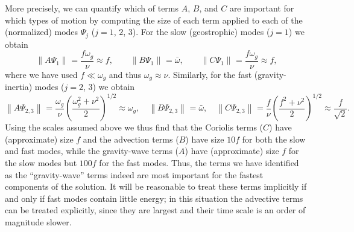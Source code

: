 \documentclass[12pt]{article}
\newcommand{\omegabar}{\bar{\omega}}
\newcommand{\norm}[2][{}]{\ensuremath{\left\|{#2}\right\|_{#1}}}
\begin{document}
More precisely, we can quantify which of terms $A$, $B$, and $C$ are important
for which types of motion by computing the size of each term applied to each
of the (normalized) modes $\Psi_j$ ($j=1$, $2$, $3$).  For the slow
(geostrophic) modes ($j=1$) we obtain
\begin{equation}
  \norm{A\Psi_1} = \frac{f\omega_g}{\nu}\approx f,
\qquad
  \norm{B\Psi_1} = \omegabar,
\qquad
  \norm{C\Psi_1} = \frac{f\omega_g}{\nu}\approx f,
\label{SW:sizes:slowmodes}
\end{equation}
where we have used $f\ll\omega_g$ and thus $\omega_g\approx\nu$.
Similarly, for the fast (gravity-inertia) modes ($j=2$, $3$) we obtain
\begin{equation}
  \norm{A\Psi_{2,3}} = \frac{\omega_g}{\nu}
                       \left(\frac{\omega_g^2 + \nu^2}{2}\right)^{1/2}
                     \approx \omega_g,
\quad
  \norm{B\Psi_{2,3}} = \omegabar,
\quad
  \norm{C\Psi_{2,3}} = \frac{f}{\nu}
                       \left(\frac{f^2 + \nu^2}{2}\right)^{1/2}
                     \approx \frac{f}{\sqrt{2}} .
\label{SW:sizes:fastmodes}
\end{equation}
Using the scales assumed above we thus find that the Coriolis terms ($C$) have
(approximate) size $f$ and the advection terms ($B$) have size $10f$ for both
the slow and fast modes, while the gravity-wave terms ($A$) have (approximate) 
size $f$ for the slow modes but $100f$ for the fast modes.  Thus, the terms we
have identified as the ``gravity-wave'' terms indeed are most important for
the fastest components of the solution.  It will be reasonable to treat these
terms implicitly if and only if fast modes contain little energy; in this
situation the advective terms can be treated explicitly, since
they are largest and their time scale is an order of magnitude slower.
\end{document}
